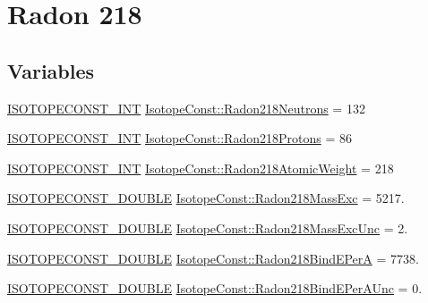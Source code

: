 \hypertarget{group___isotope_const-_radon-_rn218}{}\section{Radon 218}
\label{group___isotope_const-_radon-_rn218}
\subsection*{Variables}
\begin{DoxyCompactItemize}
\item 
\mbox{\hyperlink{group___isotope_const-_macros_ga5f18360b3e99483a35c32d789e62621c}{I\+S\+O\+T\+O\+P\+E\+C\+O\+N\+S\+T\+\_\+\+I\+NT}} \mbox{\hyperlink{group___isotope_const-_radon-_rn218_gafbe7d523f6eef456225e49f2b5b5a7e1}{Isotope\+Const\+::\+Radon218\+Neutrons}} = 132
\item 
\mbox{\hyperlink{group___isotope_const-_macros_ga5f18360b3e99483a35c32d789e62621c}{I\+S\+O\+T\+O\+P\+E\+C\+O\+N\+S\+T\+\_\+\+I\+NT}} \mbox{\hyperlink{group___isotope_const-_radon-_rn218_ga87cea8d43352e4d33544b15cebc3e837}{Isotope\+Const\+::\+Radon218\+Protons}} = 86
\item 
\mbox{\hyperlink{group___isotope_const-_macros_ga5f18360b3e99483a35c32d789e62621c}{I\+S\+O\+T\+O\+P\+E\+C\+O\+N\+S\+T\+\_\+\+I\+NT}} \mbox{\hyperlink{group___isotope_const-_radon-_rn218_ga9464ed931f5aebf78d261e63a0fc95ce}{Isotope\+Const\+::\+Radon218\+Atomic\+Weight}} = 218
\item 
\mbox{\hyperlink{group___isotope_const-_macros_ga8f45a7272ce02c0b4c65c44636ed719a}{I\+S\+O\+T\+O\+P\+E\+C\+O\+N\+S\+T\+\_\+\+D\+O\+U\+B\+LE}} \mbox{\hyperlink{group___isotope_const-_radon-_rn218_ga1b5eb87cde5568e442b2321ee7f0afd2}{Isotope\+Const\+::\+Radon218\+Mass\+Exc}} = 5217.
\item 
\mbox{\hyperlink{group___isotope_const-_macros_ga8f45a7272ce02c0b4c65c44636ed719a}{I\+S\+O\+T\+O\+P\+E\+C\+O\+N\+S\+T\+\_\+\+D\+O\+U\+B\+LE}} \mbox{\hyperlink{group___isotope_const-_radon-_rn218_ga9ae96ba2fde07fae91bc70f34bf155be}{Isotope\+Const\+::\+Radon218\+Mass\+Exc\+Unc}} = 2.
\item 
\mbox{\hyperlink{group___isotope_const-_macros_ga8f45a7272ce02c0b4c65c44636ed719a}{I\+S\+O\+T\+O\+P\+E\+C\+O\+N\+S\+T\+\_\+\+D\+O\+U\+B\+LE}} \mbox{\hyperlink{group___isotope_const-_radon-_rn218_ga27dbd2eab6a69a4d9fecd02740134b47}{Isotope\+Const\+::\+Radon218\+Bind\+E\+PerA}} = 7738.
\item 
\mbox{\hyperlink{group___isotope_const-_macros_ga8f45a7272ce02c0b4c65c44636ed719a}{I\+S\+O\+T\+O\+P\+E\+C\+O\+N\+S\+T\+\_\+\+D\+O\+U\+B\+LE}} \mbox{\hyperlink{group___isotope_const-_radon-_rn218_gaf9d8748b020204c16b758cce1b606acb}{Isotope\+Const\+::\+Radon218\+Bind\+E\+Per\+A\+Unc}} = 0.

\end{DoxyCompactItemize}
